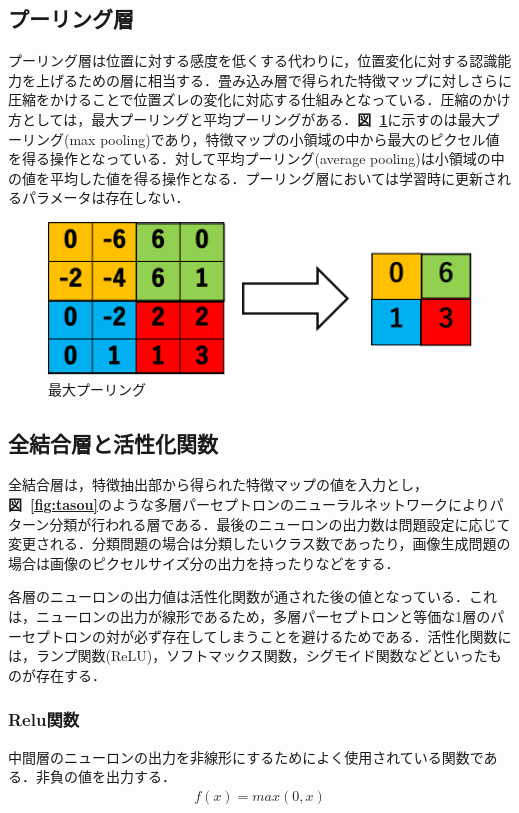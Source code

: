 \documentclass[a4j, 11pt]{jreport}
\newcommand{\figref}[1]{\textbf{図~\ref{#1}}}
\begin{document}
\subsection{プーリング層}
プーリング層は位置に対する感度を低くする代わりに，位置変化に対する認識能力を上げるための層に相当する．畳み込み層で得られた特徴マップに対しさらに圧縮をかけることで位置ズレの変化に対応する仕組みとなっている．圧縮のかけ方としては，最大プーリングと平均プーリングがある．\figref{fig:pooling}に示すのは最大プーリング(max pooling)であり，特徴マップの小領域の中から最大のピクセル値を得る操作となっている．対して平均プーリング(average pooling)は小領域の中の値を平均した値を得る操作となる．プーリング層においては学習時に更新されるパラメータは存在しない．

\begin{figure}[htbp]
	\begin{center}
		\includegraphics[scale=0.293]{./images/deeplearning/pooling.png}
		\caption{最大プーリング}
		\label{fig:pooling}
	\end{center}
\end{figure}

\newpage
\subsection{全結合層と活性化関数}
全結合層は，特徴抽出部から得られた特徴マップの値を入力とし，\figref{fig:tasou}のような多層パーセプトロンのニューラルネットワークによりパターン分類が行われる層である．最後のニューロンの出力数は問題設定に応じて変更される．分類問題の場合は分類したいクラス数であったり，画像生成問題の場合は画像のピクセルサイズ分の出力を持ったりなどをする．

各層のニューロンの出力値は活性化関数が通された後の値となっている．これは，ニューロンの出力が線形であるため，多層パーセプトロンと等価な1層のパーセプトロンの対が必ず存在してしまうことを避けるためである．活性化関数には，ランプ関数(ReLU)，ソフトマックス関数，シグモイド関数などといったものが存在する．


\subsubsection{Relu関数}
中間層のニューロンの出力を非線形にするためによく使用されている関数である．非負の値を出力する．
\begin{eqnarray}
	f(x) = max(0, x)
\end{eqnarray}
\end{document}
